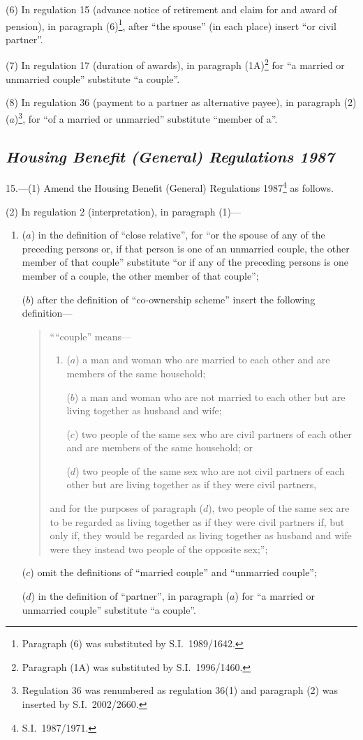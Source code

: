 \documentclass[12pt,a4paper]{article}
\begin{document}
(6) In regulation 15 (advance notice of retirement and claim for and award of pension), in paragraph (6)\footnote{Paragraph (6) was substituted by S.I.\ 1989/1642.}, after “the spouse” (in each place) insert “or civil partner”.

(7) In regulation 17 (duration of awards), in paragraph (1A)\footnote{Paragraph (1A) was substituted by S.I.\ 1996/1460.} for “a married or unmarried couple” substitute “a couple”.

(8) In regulation 36 (payment to a partner as alternative payee), in paragraph (2)($a$)\footnote{Regulation 36 was renumbered as regulation 36(1) and paragraph (2) was inserted by S.I.\ 2002/2660.}, for “of a married or unmarried” substitute “member of a”.

\subsection*{\itshape Housing Benefit (General) Regulations 1987}

15.---(1)  Amend the Housing Benefit (General) Regulations 1987\footnote{S.I.\ 1987/1971.} as follows.

(2) In regulation 2 (interpretation), in paragraph (1)—
\begin{enumerate}\item[]
($a$) in the definition of “close relative”, for “or the spouse of any of the preceding persons or, if that person is one of an unmarried couple, the other member of that couple” substitute “or if any of the preceding persons is one member of a couple, the other member of that couple”;

($b$) after the definition of “co-ownership scheme” insert the following definition—
\begin{quotation}
““couple” means—
\begin{enumerate}\item[]
($a$) 
a man and woman who are married to each other and are members of the same household;

($b$) 
a man and woman who are not married to each other but are living together as husband and wife;

($c$) 
two people of the same sex who are civil partners of each other and are members of the same household; or

($d$) 
two people of the same sex who are not civil partners of each other but are living together as if they were civil partners,
\end{enumerate}
and for the purposes of paragraph ($d$), two people of the same sex are to be regarded as living together as if they were civil partners if, but only if, they would be regarded as living together as husband and wife were they instead two people of the opposite sex;”;
\end{quotation}

($c$) omit the definitions of “married couple” and “unmarried couple”;

($d$) in the definition of “partner”, in paragraph ($a$)  for “a married or unmarried couple” substitute “a couple”.
\end{enumerate}
\end{document}
